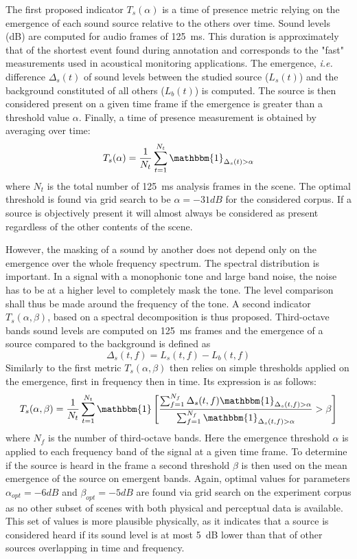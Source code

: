 \documentclass{article}
\begin{document}
\begin{sloppy}
The first proposed indicator $T_s(\alpha)$ is a time of presence metric relying on the emergence of each sound source relative to the others over time. Sound levels (dB) are computed for audio frames of 125~ms. This duration is approximately that of the shortest event found during annotation and corresponds to the "fast" measurements used in acoustical monitoring applications. The emergence, \textit{i.e.} difference $\Delta_s(t)$ of sound levels between the studied source ($L_s(t)$) and the background constituted of all others ($L_b(t)$) is computed. The source is then considered present on a given time frame if the emergence is greater than a threshold value $\alpha$. Finally, a time of presence measurement is obtained by averaging over time:
\begin{equation}
T_s(\alpha) = \frac{1}{N_t}\sum_{t = 1}^{N_t}\mathbbm{1}_{\Delta_s(t)>\alpha}
\end{equation}
where $N_t$ is the total number of 125~ms analysis frames in the scene. The optimal threshold is found via grid search to be $\alpha = -31dB$ for the considered corpus. If a source is objectively present it will almost always be considered as present regardless of the other contents of the scene.

However, the masking of a sound by another does not depend only on the emergence over the whole frequency spectrum. The spectral distribution is important. In a signal with a monophonic tone and large band noise, the noise has to be at a higher level to completely mask the tone. The level comparison shall thus be made around the frequency of the tone. A second indicator $T_s(\alpha, \beta)$, based on a spectral decomposition is thus proposed. Third-octave bands sound levels are computed on 125~ms frames and the emergence of a source compared to the background is defined as
\begin{equation}
\Delta_s(t, f) = L_s(t, f) - L_b(t, f)
\end{equation}
Similarly to the first metric $T_s(\alpha, \beta)$ then relies on simple thresholds applied on the emergence, first in frequency then in time. Its expression is as follows:
\begin{equation}
T_s(\alpha, \beta) = \frac{1}{N_t}\sum_{t = 1}^{N_t}\mathbbm{1}\left[ \frac{\sum_{f = 1}^{N_f}\Delta_s(t, f)\mathbbm{1}_{\Delta_s(t, f)>\alpha}}{\sum_{f = 1}^{N_f}\mathbbm{1}_{\Delta_s(t, f)>\alpha}}>\beta \right]
\end{equation}
where $N_f$ is the number of third-octave bands. Here the emergence threshold $\alpha$ is applied to each frequency band of the signal at a given time frame. To determine if the source is heard in the frame a second threshold $\beta$ is then used on the mean emergence of the source on emergent bands. Again, optimal values for parameters $\alpha_{opt} = -6 dB$ and $\beta_{opt} = -5 dB$ are found via grid search on the experiment corpus as no other subset of scenes with both physical and perceptual data is available. This set of values is more plausible physically, as it indicates that a source is considered heard if its sound level is at most 5~dB lower than that of other sources overlapping in time and frequency. 


\end{sloppy}
\end{document}
